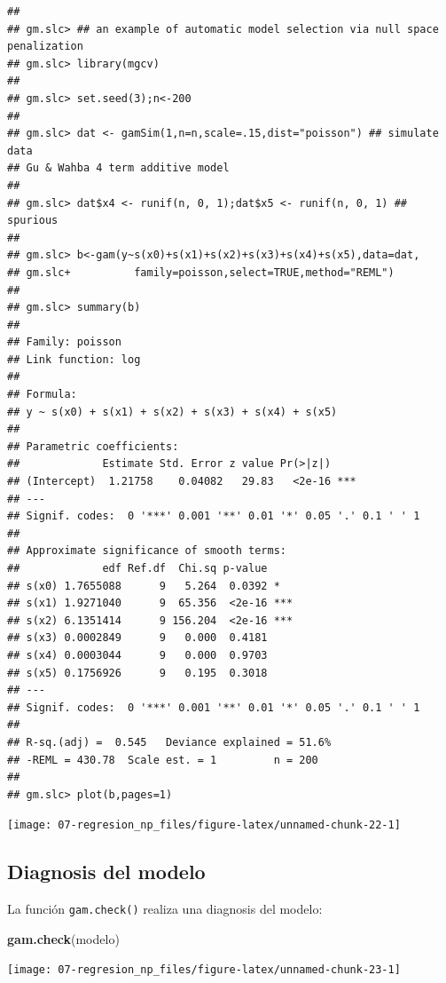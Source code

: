 \documentclass[
  spanish,
]{book}
\newenvironment{Shaded}{\begin{snugshade}}{\end{snugshade}}
\newcommand{\KeywordTok}[1]{\textcolor[rgb]{0.13,0.29,0.53}{\textbf{#1}}}
\newcommand{\NormalTok}[1]{#1}
\theoremstyle{break}
\theoremstyle{definition}
\theoremstyle{definition}
\theoremstyle{definition}
\theoremstyle{remark}
\begin{document}
\begin{verbatim}
## 
## gm.slc> ## an example of automatic model selection via null space penalization
## gm.slc> library(mgcv)
## 
## gm.slc> set.seed(3);n<-200
## 
## gm.slc> dat <- gamSim(1,n=n,scale=.15,dist="poisson") ## simulate data
## Gu & Wahba 4 term additive model
## 
## gm.slc> dat$x4 <- runif(n, 0, 1);dat$x5 <- runif(n, 0, 1) ## spurious
## 
## gm.slc> b<-gam(y~s(x0)+s(x1)+s(x2)+s(x3)+s(x4)+s(x5),data=dat,
## gm.slc+          family=poisson,select=TRUE,method="REML")
## 
## gm.slc> summary(b)
## 
## Family: poisson 
## Link function: log 
## 
## Formula:
## y ~ s(x0) + s(x1) + s(x2) + s(x3) + s(x4) + s(x5)
## 
## Parametric coefficients:
##             Estimate Std. Error z value Pr(>|z|)    
## (Intercept)  1.21758    0.04082   29.83   <2e-16 ***
## ---
## Signif. codes:  0 '***' 0.001 '**' 0.01 '*' 0.05 '.' 0.1 ' ' 1
## 
## Approximate significance of smooth terms:
##             edf Ref.df  Chi.sq p-value    
## s(x0) 1.7655088      9   5.264  0.0392 *  
## s(x1) 1.9271040      9  65.356  <2e-16 ***
## s(x2) 6.1351414      9 156.204  <2e-16 ***
## s(x3) 0.0002849      9   0.000  0.4181    
## s(x4) 0.0003044      9   0.000  0.9703    
## s(x5) 0.1756926      9   0.195  0.3018    
## ---
## Signif. codes:  0 '***' 0.001 '**' 0.01 '*' 0.05 '.' 0.1 ' ' 1
## 
## R-sq.(adj) =  0.545   Deviance explained = 51.6%
## -REML = 430.78  Scale est. = 1         n = 200
## 
## gm.slc> plot(b,pages=1)
\end{verbatim}

\begin{center}\texttt{[image: 07-regresion\_np\_files/figure-latex/unnamed-chunk-22-1]} \end{center}

\hypertarget{mgcv-diagnosis}{%
\subsection{Diagnosis del modelo}\label{mgcv-diagnosis}}

La función \texttt{gam.check()} realiza una diagnosis del modelo:

\begin{Shaded}
\begin{Highlighting}[]
\KeywordTok{gam.check}\NormalTok{(modelo)}
\end{Highlighting}
\end{Shaded}

\begin{center}\texttt{[image: 07-regresion\_np\_files/figure-latex/unnamed-chunk-23-1]} \end{center}
\end{document}
